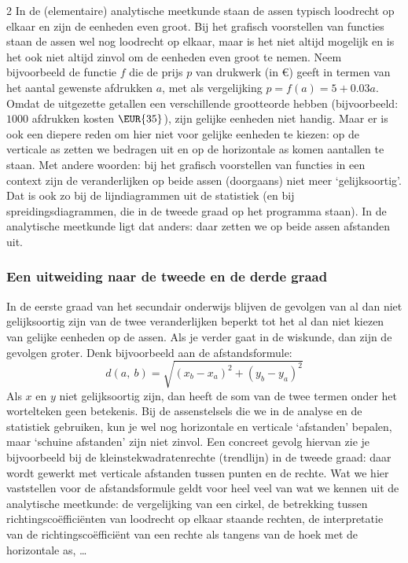 \begin{multicols}{2}
In de (elementaire) analytische meetkunde staan de assen typisch loodrecht op elkaar en zijn de eenheden even groot.
Bij het grafisch voorstellen van functies staan de assen wel nog loodrecht op elkaar, maar is het niet altijd mogelijk en is het ook niet altijd zinvol om de eenheden even groot te nemen.
Neem bijvoorbeeld de functie \(f\) die de prijs \(p\) van drukwerk (in \(\euro\)) geeft in termen van het aantal gewenste afdrukken \(a\), met als vergelijking \(p = f(a) = 5 + \num{0.03}a\).
Omdat de uitgezette getallen een verschillende grootteorde hebben (bijvoorbeeld: \(1000\) afdrukken kosten \(\EUR{35}\)), zijn gelijke eenheden niet handig.
Maar er is ook een diepere reden om hier niet voor gelijke eenheden te kiezen: op de verticale as zetten we bedragen uit en op de horizontale as komen aantallen te staan.
Met andere woorden: bij het grafisch voorstellen van functies in een context zijn de veranderlijken op beide assen (doorgaans) niet meer `gelijksoortig'.
Dat is ook zo bij de lijndiagrammen uit de statistiek (en bij spreidingsdiagrammen, die in de tweede graad op het programma staan).
In de analytische meetkunde ligt dat anders: daar zetten we op beide assen afstanden uit.

\subsubsection*{Een uitweiding naar de tweede en de derde graad}

In de eerste graad van het secundair onderwijs blijven de gevolgen van al dan niet gelijksoortig zijn van de twee veranderlijken beperkt tot het al dan niet kiezen van gelijke eenheden op de assen.
Als je verder gaat in de wiskunde, dan zijn de gevolgen groter.
Denk bijvoorbeeld aan de afstandsformule:
\[
d(a,\ b) = \sqrt{\left( x_{b} - x_{a} \right)^{2} + \left( y_{b} - y_{a} \right)^{2}}
\]
Als \(x\) en \(y\) niet gelijksoortig zijn, dan heeft de som van de twee termen onder het wortelteken geen betekenis.
Bij de assenstelsels die we in de analyse en de statistiek gebruiken, kun je wel nog horizontale en verticale `afstanden' bepalen, maar `schuine afstanden' zijn niet zinvol.
Een concreet gevolg hiervan zie je bijvoorbeeld bij de kleinstekwadratenrechte (trendlijn) in de tweede graad: daar wordt gewerkt met verticale afstanden tussen punten en de rechte.
Wat we hier vaststellen voor de afstandsformule geldt voor heel veel van wat we kennen uit de analytische meetkunde: de vergelijking van een cirkel, de betrekking tussen richtingscoëfficiënten van loodrecht op elkaar staande rechten, de interpretatie van de richtingscoëfficiënt van een rechte als tangens van de hoek met de horizontale as, \ldots{}


\end{multicols}

